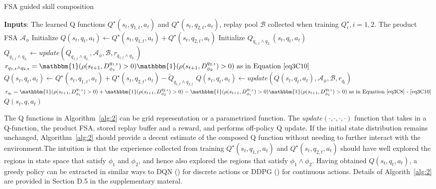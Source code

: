 \documentclass{article}
\begin{document}
\begin{algorithm}
\caption{FSA guided skill composition}
\label{alg:2}
\begin{algorithmic}[1]
\State \textbf{Inputs}: The learned Q functions $Q^\star(s_t,q_{1,t},a_t)$ and $Q^\star(s_t,q_{2,t},a_t)$, replay pool $\mathcal{B}$ collected when training $Q^\star_i, i=1,2$. The product FSA $\mathcal{A}_\phi$
\State Initialize  $Q(s_t, q_t, a_t) \leftarrow Q^\star(s_t,q_{1,t},a_t) + Q^\star(s_t,q_{2,t},a_t)$
\State Initialize $Q_{q_{1,t} \wedge q_{2,}}(s_t, q_t, a_t)$
\State $Q_{q_{1,t} \wedge q_{2,}} \leftarrow update(Q_{q_{1,t} \wedge q_{2,}},\mathcal{A}_\phi, \mathcal{B}, r_{q_{1,t}\wedge q_{2,}})$ \Comment $r_{q_{1,t} \wedge q_{2,t}}=\mathbbm{1}(\rho(s_{t+1},D_{\phi_1}^{q_{1,t}})>0)\mathbbm{1}(\rho(s_{t+1},D_{\phi_2}^{q_{2,t}})>0) \textrm{ as in Equation~\eqref{eq3C10}}$
\State $Q(s_t, q_t, a_t) \leftarrow Q^\star(s_t,q_{1,t},a_t) + Q^\star(s_t,q_{2,t},a_t) - \tilde{Q}_{q_{1,t} \wedge q_{2,t}}$
\State $Q(s_t, q_t, a_t) \leftarrow update(Q(s_t, q_t, a_t),\mathcal{A}_\phi, \mathcal{B}, r_{q_t})$ \Comment $r_{q_t}=\mathbbm{1}(\rho(s_{t+1},D_{\phi_1}^{q_{1,t}})>0)+\mathbbm{1}(\rho(s_{t+1},D_{\phi_2}^{q_{2,t}})>0) - \mathbbm{1}(\rho(s_{t+1},D_{\phi_1}^{q_{1,t}})>0)\mathbbm{1}(\rho(s_{t+1},D_{\phi_2}^{q_{2,t}})>0) \textrm{ as in Equation~\eqref{eq3C8} - \eqref{eq3C10}}$\\
\Return $Q(s_t, q, a_t)$
\end{algorithmic}
\end{algorithm}

\noindent The Q functions in Algorithm~\ref{alg:2} can be grid representation or a parametrized function. The $update(\cdot, \cdot, \cdot, \cdot)$  function that takes in a Q-function, the product FSA, stored replay buffer and a reward, and performs off-policy Q update. If the initial state distribution remains unchanged, Algorithm~\ref{alg:2} should provide a decent estimate of the composed Q function without needing to further interact with the environment.The intuition is that the experience collected from training $Q^\star(s_t,q_{1,t},a_t)$ and $Q^\star(s_t,q_{2,t},a_t)$ should have well explored the regions in state space that satisfy $\phi_1$ and $\phi_2$, and hence also explored the regions that satisfy $\phi_1 \wedge \phi_2$. Having obtained $Q(s_t,q_t,a_t)$, a greedy policy can be extracted in similar ways to DQN (\cite{Mnih2015}) for discrete actions or DDPG (\cite{Silver2014}) for continuous actions. Details of Algorith~\ref{alg:2} are provided in Section D.5 in the supplementary materal.
\end{document}
